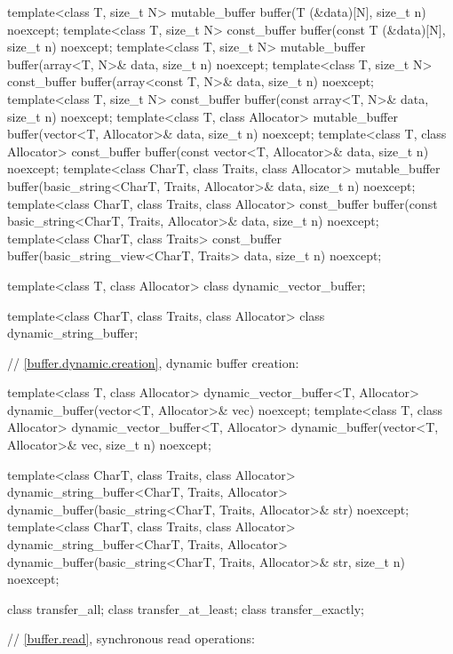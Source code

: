 \begin{codeblock}
{{{  template<class T, size_t N>
    mutable_buffer buffer(T (&data)[N], size_t n) noexcept;
  template<class T, size_t N>
    const_buffer buffer(const T (&data)[N], size_t n) noexcept;
  template<class T, size_t N>
    mutable_buffer buffer(array<T, N>& data, size_t n) noexcept;
  template<class T, size_t N>
    const_buffer buffer(array<const T, N>& data, size_t n) noexcept;
  template<class T, size_t N>
    const_buffer buffer(const array<T, N>& data, size_t n) noexcept;
  template<class T, class Allocator>
    mutable_buffer buffer(vector<T, Allocator>& data, size_t n) noexcept;
  template<class T, class Allocator>
    const_buffer buffer(const vector<T, Allocator>& data, size_t n) noexcept;
  template<class CharT, class Traits, class Allocator>
    mutable_buffer buffer(basic_string<CharT, Traits, Allocator>& data,
                          size_t n) noexcept;
  template<class CharT, class Traits, class Allocator>
    const_buffer buffer(const basic_string<CharT, Traits, Allocator>& data,
                        size_t n) noexcept;
  template<class CharT, class Traits>
    const_buffer buffer(basic_string_view<CharT, Traits> data,
                        size_t n) noexcept;

  template<class T, class Allocator>
    class dynamic_vector_buffer;

  template<class CharT, class Traits, class Allocator>
    class dynamic_string_buffer;

  // \ref{buffer.dynamic.creation}, dynamic buffer creation:

  template<class T, class Allocator>
    dynamic_vector_buffer<T, Allocator>
    dynamic_buffer(vector<T, Allocator>& vec) noexcept;
  template<class T, class Allocator>
    dynamic_vector_buffer<T, Allocator>
    dynamic_buffer(vector<T, Allocator>& vec, size_t n) noexcept;

  template<class CharT, class Traits, class Allocator>
    dynamic_string_buffer<CharT, Traits, Allocator>
    dynamic_buffer(basic_string<CharT, Traits, Allocator>& str) noexcept;
  template<class CharT, class Traits, class Allocator>
    dynamic_string_buffer<CharT, Traits, Allocator>
    dynamic_buffer(basic_string<CharT, Traits, Allocator>& str, size_t n) noexcept;

  class transfer_all;
  class transfer_at_least;
  class transfer_exactly;

  // \ref{buffer.read}, synchronous read operations:

}}}
\end{codeblock}
